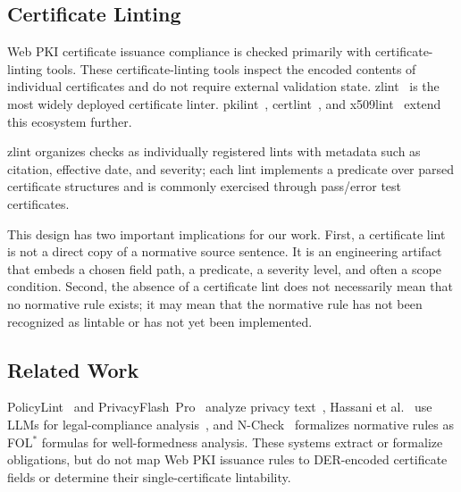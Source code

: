 \subsection{Certificate Linting}
\label{sec:bg-linting}

Web PKI certificate issuance compliance is checked primarily with certificate-linting tools. These certificate-linting tools inspect the encoded contents of individual certificates and do not require external validation state. zlint~\cite{kumar2018tracking} is the most widely deployed certificate linter. pkilint~\cite{pkilint}, certlint~\cite{certlint}, and x509lint~\cite{x509lint} extend this ecosystem further.

zlint organizes checks as individually registered lints with metadata such as citation, effective date, and severity; each lint implements a predicate over parsed certificate structures and is commonly exercised through pass/error test certificates.

This design has two important implications for our work. First, a certificate lint is not a direct copy of a normative source sentence. It is an engineering artifact that embeds a chosen field path, a predicate, a severity level, and often a scope condition. Second, the absence of a certificate lint does not necessarily mean that no normative rule exists; it may mean that the normative rule has not been recognized as lintable or has not yet been implemented.

\subsection{Related Work}
\label{sec:bg-related}

PolicyLint~\cite{andow2019policylint} and PrivacyFlash~Pro~\cite{zimmeck2021privacyflash}
analyze privacy text~\cite{harkous2018polisis,amaral2022ai}, Hassani et al.~\cite{hassani2024rethinking} use LLMs for
legal-compliance analysis~\cite{sun2025compliance,masoudifard2024leveraging,chung2025graphcompliance}, and N-Check~\cite{feng2024analyzing} formalizes
normative rules as FOL$^*$ formulas for well-formedness analysis. These systems
extract or formalize obligations, but do not map Web PKI issuance rules to
DER-encoded certificate fields or determine their single-certificate lintability.

